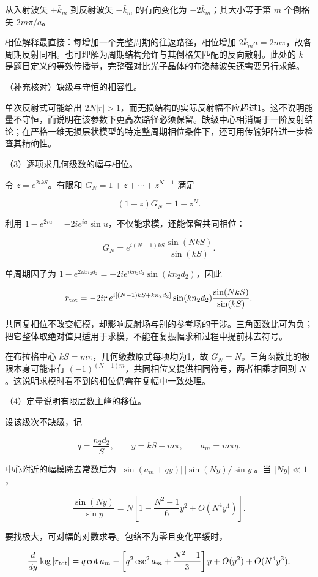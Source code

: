 \documentclass[12pt,a4paper,fontset=fandol]{ctexart}
\begin{document}
从入射波矢 \(+\bar k_m\) 到反射波矢 \(-\bar k_m\) 的有向变化为
\(-2\bar k_m\)；其大小等于第 \(m\) 个倒格矢 \(2m\pi/a\)。

相位解释最直接：每增加一个完整周期的往返路径，相位增加
\(2\bar k_ma=2m\pi\)，故各周期反射同相。也可理解为周期结构允许与其倒格矢匹配的反向散射。此处的
\(\bar k\)
是题目定义的等效传播量，完整强对比光子晶体的布洛赫波矢还需要另行求解。

（补充核对）缺级与守恒的相容性。

单次反射式可能给出
\(2N|r|>1\)，而无损结构的实际反射幅不应超过1。这不说明能量不守恒，而说明在该参数下更高次路径必须保留。缺级中心相消属于一阶反射结论；在严格一维无损层状模型的特定整周期相位条件下，还可用传输矩阵进一步检查其精确性。

（3）逐项求几何级数的幅与相位。

令 \(z=e^{2ikS}\)。有限和 \(G_N=1+z+\cdots+z^{N-1}\) 满足

\[
(1-z)G_N=1-z^N.
\]

利用 \(1-e^{2iu}=-2ie^{iu}\sin u\)，不仅能求模，还能保留共同相位：

\[
G_N=e^{i(N-1)kS}\frac{\sin(NkS)}{\sin(kS)}.
\]

单周期因子为 \(1-e^{2ikn_2d_2}=-2ie^{ikn_2d_2}\sin(kn_2d_2)\)，因此

\[
r_{\rm tot}
=-2ir\,e^{i[(N-1)kS+kn_2d_2]}
\sin(kn_2d_2)\frac{\sin(NkS)}{\sin(kS)}.
\]

共同复相位不改变幅模，却影响反射场与别的参考场的干涉。三角函数比可为负；把它整体取绝对值只适用于求模，不能在复振幅求和过程中提前抹去符号。

在布拉格中心 \(kS=m\pi\)，几何级数原式每项均为1，故
\(G_N=N\)。三角函数比的极限本身可能带有
\((-1)^{(N-1)m}\)，共同相位又提供相同符号，两者相乘才回到
\(N\)。这说明求模时看不到的相位仍需在复幅中一致处理。

（4）定量说明有限层数主峰的移位。

设该级次不缺级，记

\[
q=\frac{n_2d_2}{S},\qquad y=kS-m\pi,\qquad a_m=m\pi q.
\]

中心附近的幅模除去常数后为 \(|\sin(a_m+qy)|\,|\sin(Ny)/\sin y|\)。当
\(|Ny|\ll1\)，

\[
\frac{\sin(Ny)}{\sin y}
=N\left[1-\frac{N^2-1}{6}y^2+O(N^4y^4)\right].
\]

要找极大，可对幅的对数求导。包络不为零且变化平缓时，

\[
\frac d{dy}\log|r_{\rm tot}|
=q\cot a_m
-\left[q^2\csc^2a_m+\frac{N^2-1}{3}\right]y
+O(y^2)+O(N^4y^3).
\]
\end{document}
